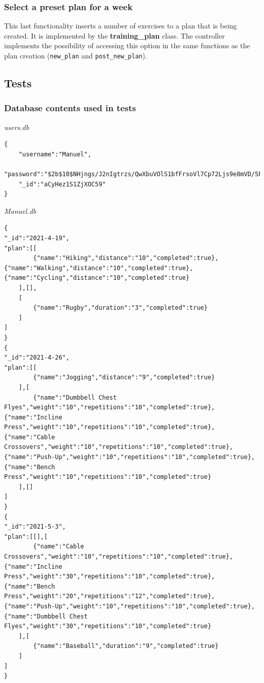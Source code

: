 \documentclass[12pt,twoside,titlepage,a4paper]{article}
\theoremstyle{definicion}
\theoremstyle{lema}
\theoremstyle{teorema}
\theoremstyle{corolario}
\theoremstyle{ejemplo}
\theoremstyle{nota}
\begin{document}
\subsubsection{Select a preset plan for a week}

This last functionality inserts a number of exercises to a plan that is being created. It is implemented by the \textbf{training\_plan}
class. The controller implements the possibility of accessing this option in the same functions as the plan creation (\texttt{new\_plan}
and \texttt{post\_new\_plan}).

\subsection{Tests}

\subsubsection*{Database contents used in tests}

\textit{users.db}
\begin{lstlisting}
{
	"username":"Manuel",
	"password":"$2b$10$NHjngs/J2nIgtrzs/QwXbuVOlS1bfFrsoVl7Cp72Ljs9e8mVD/5PW",
	"_id":"aCyHez1S1ZjXOC59"
}
\end{lstlisting}
\textit{Manuel.db}
\begin{lstlisting}
{
"_id":"2021-4-19",
"plan":[[
		{"name":"Hiking","distance":"10","completed":true},{"name":"Walking","distance":"10","completed":true},{"name":"Cycling","distance":"10","completed":true}
	],[],
	[
		{"name":"Rugby","duration":"3","completed":true}
	]
]
}
{
"_id":"2021-4-26",
"plan":[[
		{"name":"Jogging","distance":"9","completed":true}
	],[
		{"name":"Dumbbell Chest Flyes","weight":"10","repetitions":"10","completed":true},{"name":"Incline Press","weight":"10","repetitions":"10","completed":true},{"name":"Cable Crossovers","weight":"10","repetitions":"10","completed":true},{"name":"Push-Up","weight":"10","repetitions":"10","completed":true},{"name":"Bench Press","weight":"10","repetitions":"10","completed":true}
	],[]
]
}
{
"_id":"2021-5-3",
"plan":[[],[
		{"name":"Cable Crossovers","weight":"10","repetitions":"10","completed":true},{"name":"Incline Press","weight":"30","repetitions":"10","completed":true},{"name":"Bench Press","weight":"20","repetitions":"12","completed":true},{"name":"Push-Up","weight":"10","repetitions":"10","completed":true},{"name":"Dumbbell Chest Flyes","weight":"30","repetitions":"10","completed":true}
	],[
		{"name":"Baseball","duration":"9","completed":true}
	]
]
}	
\end{lstlisting}
\end{document}
